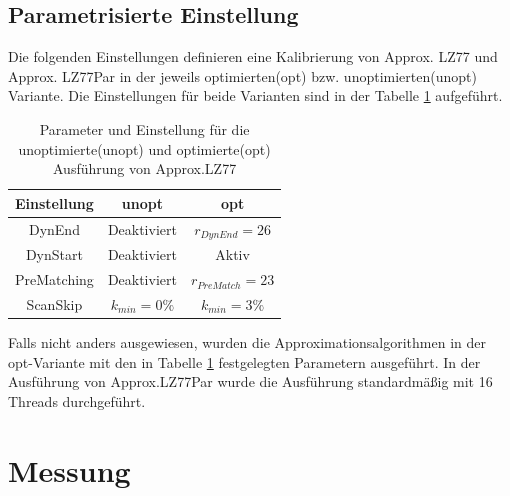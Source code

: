 \subsection{Parametrisierte Einstellung}
Die folgenden Einstellungen definieren eine Kalibrierung von Approx. LZ77 und Approx. LZ77Par in der jeweils optimierten(opt) bzw. unoptimierten(unopt) Variante. 
Die Einstellungen für beide Varianten sind in der Tabelle \ref{settings} aufgeführt.

\begin{table} [ht]
    \centering
    \caption{Parameter und Einstellung für die unoptimierte(unopt) und optimierte(opt) Ausführung von Approx.LZ77}
    \label{settings}
    \begin{tabular}{|c|c|c|}
        \hline
        \textbf{Einstellung} & \textbf{unopt} & \textbf{opt} \\
        \hline
        DynEnd & Deaktiviert & $r_{DynEnd}=26$ \\
        \hline
        DynStart & Deaktiviert & Aktiv \\
        \hline
        PreMatching & Deaktiviert & $r_{PreMatch}=23$ \\
        \hline
        ScanSkip & $k_{min}=0\%$ & $k_{min}=3\%$ \\
        \hline
    \end{tabular}
\end{table}

Falls nicht anders ausgewiesen, wurden die Approximationsalgorithmen in der opt-Variante mit den in Tabelle \ref{settings} festgelegten Parametern ausgeführt. In der
Ausführung von Approx.LZ77Par wurde die Ausführung standardmäßig mit 16 Threads durchgeführt.

\section{Messung}

